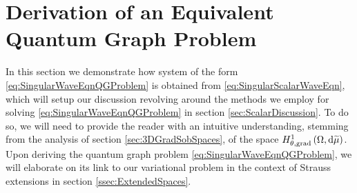 \section{Derivation of an Equivalent Quantum Graph Problem} \label{sec:ScalarDerivation}
In this section we demonstrate how system of the form \eqref{eq:SingularWaveEqnQGProblem} is obtained from \eqref{eq:SingularScalarWaveEqn}, which will setup our discussion revolving around the methods we employ for solving \eqref{eq:SingularWaveEqnQGProblem} in section \ref{sec:ScalarDiscussion}.
To do so, we will need to provide the reader with an intuitive understanding, stemming from the analysis of section \ref{sec:3DGradSobSpaces}, of the space $H^1_{\theta, \mathrm{grad}}\left( \Omega, \mathrm{d}\widetilde{\mu} \right)$.
Upon deriving the quantum graph problem \eqref{eq:SingularWaveEqnQGProblem}, we will elaborate on its link to our variational problem in the context of Strauss extensions in section \ref{ssec:ExtendedSpaces}.



